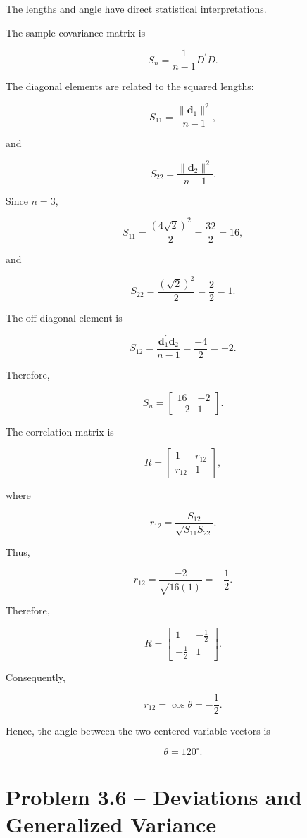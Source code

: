 \documentclass{article}
\begin{document}
The lengths and angle have direct statistical interpretations.

The sample covariance matrix is

\[
S_n
=
\frac{1}{n-1}D^\prime D.
\]

The diagonal elements are related to the squared lengths:

\[
S_{11}
=
\frac{\|\mathbf d_1\|^2}{n-1},
\]

and

\[
S_{22}
=
\frac{\|\mathbf d_2\|^2}{n-1}.
\]

Since \(n=3\),

\[
S_{11}
=
\frac{(4\sqrt2)^2}{2}
=
\frac{32}{2}
=
16,
\]

and

\[
S_{22}
=
\frac{(\sqrt2)^2}{2}
=
\frac{2}{2}
=
1.
\]

The off-diagonal element is

\[
S_{12}
=
\frac{\mathbf d_1^\prime\mathbf d_2}{n-1}
=
\frac{-4}{2}
=
-2.
\]

Therefore,

\[
\boxed{
S_n=
\begin{bmatrix}
16&-2\\
-2&1
\end{bmatrix}}.
\]

The correlation matrix is

\[
R=
\begin{bmatrix}
1&r_{12}\\
r_{12}&1
\end{bmatrix},
\]

where

\[
r_{12}
=
\frac{S_{12}}
{\sqrt{S_{11}S_{22}}}.
\]

Thus,

\[
r_{12}
=
\frac{-2}{\sqrt{16(1)}}
=
-\frac12.
\]

Therefore,

\[
\boxed{
R=
\begin{bmatrix}
1&-\frac12\\
-\frac12&1
\end{bmatrix}}.
\]

Consequently,

\[
\boxed{
r_{12}=\cos\theta=-\frac12}.
\]

Hence, the angle between the two centered variable vectors is

\[
\boxed{\theta=120^\circ}.
\]



\section*{Problem 3.6 -- Deviations and Generalized Variance}
\end{document}
